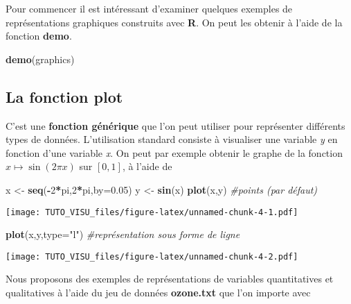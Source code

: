 \documentclass[]{book}
\newenvironment{Shaded}{\begin{snugshade}}{\end{snugshade}}
\newcommand{\CommentTok}[1]{\textcolor[rgb]{0.56,0.35,0.01}{\textit{#1}}}
\newcommand{\DataTypeTok}[1]{\textcolor[rgb]{0.13,0.29,0.53}{#1}}
\newcommand{\DecValTok}[1]{\textcolor[rgb]{0.00,0.00,0.81}{#1}}
\newcommand{\FloatTok}[1]{\textcolor[rgb]{0.00,0.00,0.81}{#1}}
\newcommand{\KeywordTok}[1]{\textcolor[rgb]{0.13,0.29,0.53}{\textbf{#1}}}
\newcommand{\NormalTok}[1]{#1}
\newcommand{\OperatorTok}[1]{\textcolor[rgb]{0.81,0.36,0.00}{\textbf{#1}}}
\newcommand{\StringTok}[1]{\textcolor[rgb]{0.31,0.60,0.02}{#1}}
\theoremstyle{definition}
\theoremstyle{definition}
\theoremstyle{definition}
\theoremstyle{remark}
\begin{document}
Pour commencer il est intéressant d'examiner quelques exemples de représentations graphiques construits avec \textbf{R}. On peut les obtenir à l'aide de la fonction \textbf{demo}.

\begin{Shaded}
\begin{Highlighting}[]
\KeywordTok{demo}\NormalTok{(graphics)}
\end{Highlighting}
\end{Shaded}

\hypertarget{la-fonction-plot}{%
\subsection{\texorpdfstring{La fonction \textbf{plot}}{La fonction plot}}\label{la-fonction-plot}}

C'est une \textbf{fonction générique} que l'on peut utiliser pour représenter différents types de données. L'utilisation standard consiste à visualiser une variable \emph{y} en fonction d'une variable \emph{x}. On peut par exemple obtenir le graphe de la fonction \(x\mapsto \sin(2\pi x)\) sur \([0,1]\), à l'aide de

\begin{Shaded}
\begin{Highlighting}[]
\NormalTok{x <-}\StringTok{ }\KeywordTok{seq}\NormalTok{(}\OperatorTok{-}\DecValTok{2}\OperatorTok{*}\NormalTok{pi,}\DecValTok{2}\OperatorTok{*}\NormalTok{pi,}\DataTypeTok{by=}\FloatTok{0.05}\NormalTok{)}
\NormalTok{y <-}\StringTok{ }\KeywordTok{sin}\NormalTok{(x)}
\KeywordTok{plot}\NormalTok{(x,y) }\CommentTok{#points (par défaut)}
\end{Highlighting}
\end{Shaded}

\texttt{[image: TUTO\_VISU\_files/figure-latex/unnamed-chunk-4-1.pdf]}

\begin{Shaded}
\begin{Highlighting}[]
\KeywordTok{plot}\NormalTok{(x,y,}\DataTypeTok{type=}\StringTok{"l"}\NormalTok{) }\CommentTok{#représentation sous forme de ligne}
\end{Highlighting}
\end{Shaded}

\texttt{[image: TUTO\_VISU\_files/figure-latex/unnamed-chunk-4-2.pdf]}

Nous proposons des exemples de représentations de variables quantitatives et qualitatives à l'aide du jeu de données \textbf{ozone.txt} que l'on importe avec
\end{document}
